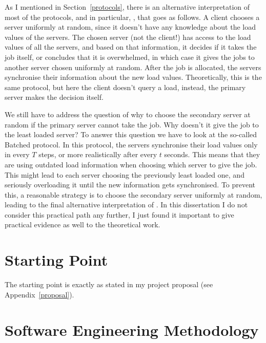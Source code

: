 As I mentioned in Section~\ref{protocols}, there is an alternative interpretation of most of the protocols, and in particular, \TwoThinning, that goes as follows. A client chooses a server uniformly at random, since it doesn't have any knowledge about the load values of the servers. The chosen server (not the client!) has access to the load values of all the servers, and based on that information, it decides if it takes the job itself, or concludes that it is overwhelmed, in which case it gives the jobs to another server chosen uniformly at random. After the job is allocated, the servers synchronise their information about the new load values. Theoretically, this is the same \TwoThinning protocol, but here the client doesn't query a load, instead, the primary server makes the decision itself.


We still have to address the question of why to choose the secondary server at random if the primary server cannot take the job. Why doesn't it give the job to the least loaded server? To answer this question we have to look at the so-called Batched protocol. In this protocol, the servers synchronise their load values only in every $T$ steps, or more realistically after every $t$ seconds. This means that they are using outdated load information when choosing which server to give the job. This might lead to each server choosing the previously least loaded one, and seriously overloading it until the new information gets synchronised. To prevent this, a reasonable strategy is to choose the secondary server uniformly at random, leading to the final alternative interpretation of \TwoThinning. In this dissertation I do not consider this practical path any further, I just found it important to give practical evidence as well to the theoretical work.
\fi


\section{Starting Point}

The starting point is exactly as stated in my project proposal (see Appendix~\ref{proposal}). 


\section{Software Engineering Methodology}





